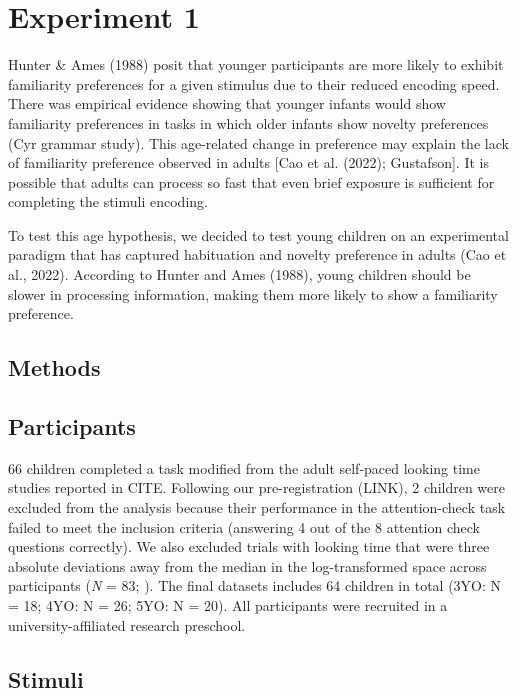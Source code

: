\documentclass[10pt, letterpaper]{article}
\begin{document}
\hypertarget{experiment-1}{%
\section{Experiment 1}\label{experiment-1}}

Hunter \& Ames (1988) posit that younger participants are more likely to
exhibit familiarity preferences for a given stimulus due to their
reduced encoding speed. There was empirical evidence showing that
younger infants would show familiarity preferences in tasks in which
older infants show novelty preferences (Cyr grammar study). This
age-related change in preference may explain the lack of familiarity
preference observed in adults {[}Cao et al. (2022); Gustafson{]}. It is
possible that adults can process so fast that even brief exposure is
sufficient for completing the stimuli encoding.

To test this age hypothesis, we decided to test young children on an
experimental paradigm that has captured habituation and novelty
preference in adults (Cao et al., 2022). According to Hunter and Ames
(1988), young children should be slower in processing information,
making them more likely to show a familiarity preference.

\hypertarget{methods}{%
\subsection{Methods}\label{methods}}

\hypertarget{participants}{%
\subsection{Participants}\label{participants}}

66 children completed a task modified from the adult self-paced looking
time studies reported in CITE. Following our pre-registration (LINK), 2
children were excluded from the analysis because their performance in
the attention-check task failed to meet the inclusion criteria
(answering 4 out of the 8 attention check questions correctly). We also
excluded trials with looking time that were three absolute deviations
away from the median in the log-transformed space across participants
(\emph{N} = 83; ). The final datasets includes 64 children in total
(3YO: N = 18; 4YO: N = 26; 5YO: N = 20). All participants were recruited
in a university-affiliated research preschool.

\hypertarget{stimuli}{%
\subsection{Stimuli}\label{stimuli}}
\end{document}
